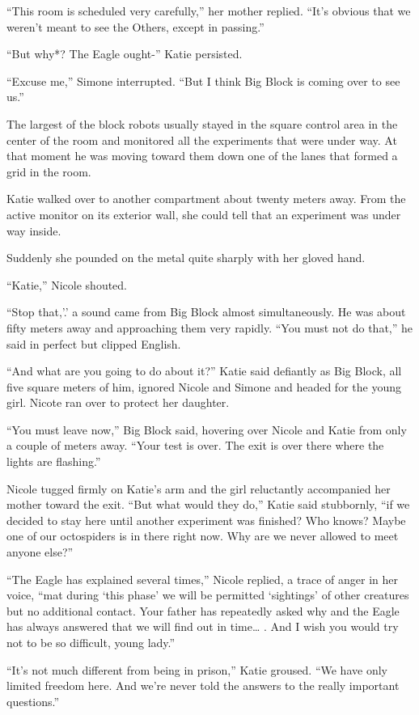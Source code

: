 \documentclass[]{article}
\begin{document}
{“This room is scheduled very carefully,” her mother replied.  “It’s obvious that we weren’t meant to see the Others, except in passing.”

“But why*? The Eagle ought-” Katie persisted.

“Excuse me,” Simone interrupted.  “But I think Big Block is coming over to see us.”

The largest of the block robots usually stayed in the square control area in the center of the room and monitored all the experiments that were under way.  At that moment he was moving toward them down one of the lanes that formed a grid in the room.

Katie walked over to another compartment about twenty meters away.  From the active monitor on its exterior wall, she could tell that an experiment was under way inside.

Suddenly she pounded on the metal quite sharply with her gloved hand.

“Katie,” Nicole shouted.

“Stop that,’.’ a sound came from Big Block almost simultaneously.  He was about fifty meters away and approaching them very rapidly.  “You must not do that,” he said in perfect but clipped English.

“And what are you going to do about it?” Katie said defiantly as Big Block, all five square meters of him, ignored Nicole and Simone and headed for the young girl.  Nicote ran over to protect her daughter.

“You must leave now,” Big Block said, hovering over Nicole and Katie from only a couple of meters away.  “Your test is over.  The exit is over there where the lights are flashing.”

Nicole tugged firmly on Katie’s arm and the girl reluctantly accompanied her mother toward the exit.  “But what would they do,” Katie said stubbornly, “if we decided to stay here until another experiment was finished? Who knows? Maybe one of our octospiders is in there right now.  Why are we never allowed to meet anyone else?”

“The Eagle has explained several times,” Nicole replied, a trace of anger in her voice, “mat during ‘this phase’ we will be permitted ‘sightings’ of other creatures but no additional contact.  Your father has repeatedly asked why and the Eagle has always answered that we will find out in time… .  And I wish you would try not to be so difficult, young lady.”

“It’s not much different from being in prison,” Katie groused.  “We have only limited freedom here.  And we’re never told the answers to the really important questions.”

}
\end{document}
